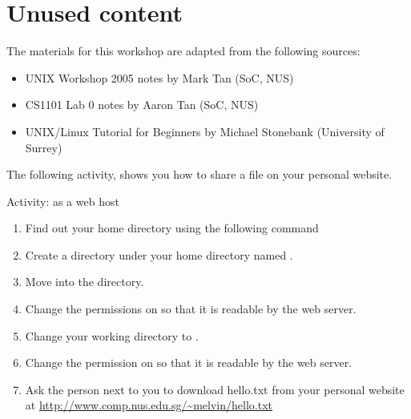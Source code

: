 \section{Unused content}

\begin{frame}
The materials for this workshop are adapted from the following sources:
\begin{itemize}
\item UNIX Workshop 2005 notes by Mark Tan (SoC, NUS)
\item CS1101 Lab 0 notes by Aaron Tan (SoC, NUS)
\item UNIX/Linux Tutorial for Beginners by Michael Stonebank (University of Surrey)
\end{itemize}
\end{frame}

The following activity, shows you how to share a file on your personal website.  

\begin{frame}[allowframebreaks=0.6]{Activity:  as a web host}
\begin{enumerate}
\item Find out your home directory using the following command
\item Create a directory under your home directory named
. 
\item Move  into the  directory. 
\item Change the permissions on  so that it is readable by
the web server. 
\item Change your working directory to . 
\item Change the permission on  so that it is readable by the
web server.  
\item Ask the person next to you to download hello.txt from your personal
website at \url{http://www.comp.nus.edu.sg/~melvin/hello.txt}
\end{enumerate}
\end{frame}



